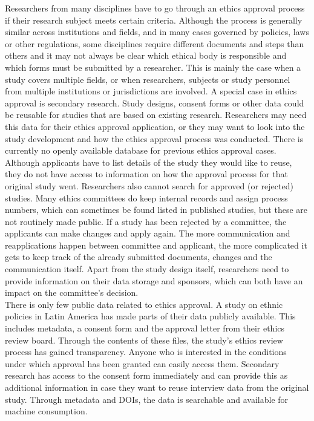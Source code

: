 \documentclass[10pt]{article}
\begin{document}
Researchers from many disciplines have to go through an ethics approval process if their research subject meets certain criteria. 
Although the process is generally similar across institutions and fields, and in many cases governed by policies, laws or other regulations, some disciplines require different documents and steps than others and it may not always be clear which ethical body is responsible and which forms must be submitted by a researcher. This is mainly the case when a study covers multiple fields, or when researchers, subjects or study personnel from multiple institutions or jurisdictions are involved. A special case in ethics approval is secondary research. Study designs, consent forms or other data could be reusable for studies that are based on existing research. Researchers may need this data for their ethics approval application, or they may want to look into the study development and how the ethics approval process was conducted.
There is currently no openly available database for previous ethics approval cases. Although applicants have to list details of the study they would like to reuse, they do not have access to information on how the approval process for that original study went. Researchers also cannot search for approved (or rejected) studies. Many ethics committees do keep internal records and assign process numbers, which can sometimes be found listed in published studies, but these are not routinely made public. If a study has been rejected by a committee, the applicants can make changes and apply again. The more communication and reapplications happen between committee and applicant, the more complicated it gets to keep track of the already submitted documents, changes and the communication itself. Apart from the study design itself, researchers need to provide information on their data storage and sponsors, which can both have an impact on the committee's decision. 
\\

There is only few public data related to ethics approval. A study on ethnic policies in Latin America has made parts of their data publicly available. \cite{casestudy} This includes metadata, a consent form and the approval letter from their ethics review board. Through the contents of these files, the study's ethics review process has gained transparency. Anyone who is interested in the conditions under which approval has been granted can easily access them. Secondary research has access to the consent form immediately and can provide this as additional information in case they want to reuse interview data from the original study. Through metadata and DOIs, the data is searchable and available for machine consumption. 
\\
\end{document}
